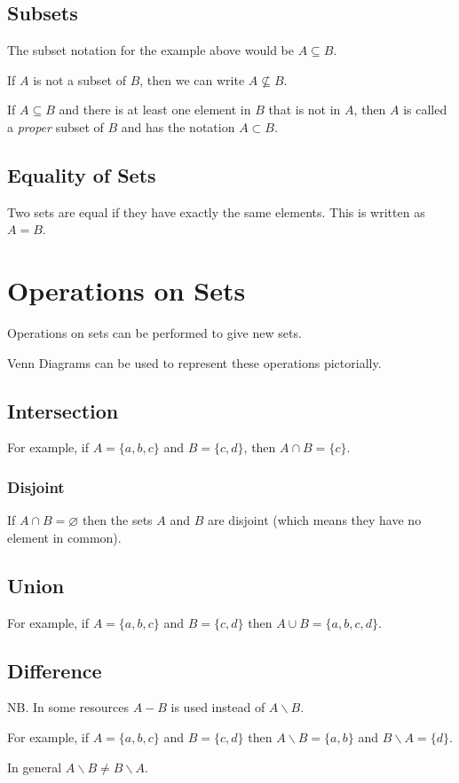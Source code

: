\subsection*{Subsets}
The subset notation for the example above would be $A \subseteq B$.

If $A$ is not a subset of $B$, then we can write $A \nsubseteq B$. 

If $A \subseteq B$ and there is at least one element in $B$ that is not in $A$, then $A$ is called a \textit{proper} subset of $B$ and has the notation $A \subset B$.

\subsection*{Equality of Sets}
Two sets are equal if they have exactly the same elements. This is written as $A=B$.

\section*{Operations on Sets}
Operations on sets can be performed to give new sets.

Venn Diagrams can be used to represent these operations pictorially. 
\subsection*{Intersection}

For example, if $A= \{a, b, c\}$ and $B = \{c, d\}$, then $A \cap B = \{c\}$. 

\subsubsection*{Disjoint}
If $A \cap B = \varnothing$ then the sets $A$ and $B$ are disjoint (which means they have no element in common). 

\subsection*{Union}
For example, if $A= \{a, b, c\}$ and $B = \{c, d\}$ then $A \cup B =\{a, b, c, d\}$. 

\subsection*{Difference}
NB. In some resources $A - B$ is used instead of $A \backslash B$. 

For example, if $A = \{a, b, c\}$ and $B = \{c, d\}$ then $A \backslash B = \{a, b\}$ and $B \backslash A = \{d\}$.

In general $A \backslash B \neq B \backslash A$.